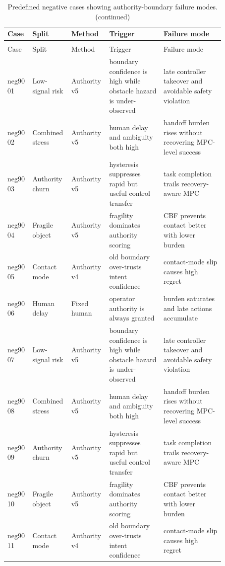 \documentclass{article}
\begin{document}
\begin{center}
\tiny
\begin{longtable}{@{}p{0.08\linewidth}p{0.14\linewidth}p{0.14\linewidth}p{0.24\linewidth}p{0.27\linewidth}@{}}
\caption{Predefined negative cases showing authority-boundary failure modes.}\label{tab:negative}\\
\toprule
Case & Split & Method & Trigger & Failure mode\\
\midrule
\endfirsthead
\caption[]{Predefined negative cases showing authority-boundary failure modes. (continued)}\\
\toprule
Case & Split & Method & Trigger & Failure mode\\
\midrule
\endhead
neg90 01 & Low-signal risk & Authority v5 & boundary confidence is high while obstacle hazard is under-observed & late controller takeover and avoidable safety violation\\
neg90 02 & Combined stress & Authority v5 & human delay and ambiguity both high & handoff burden rises without recovering MPC-level success\\
neg90 03 & Authority churn & Authority v5 & hysteresis suppresses rapid but useful control transfer & task completion trails recovery-aware MPC\\
neg90 04 & Fragile object & Authority v5 & fragility dominates authority scoring & CBF prevents contact better with lower burden\\
neg90 05 & Contact mode & Authority v4 & old boundary over-trusts intent confidence & contact-mode slip causes high regret\\
neg90 06 & Human delay & Fixed human & operator authority is always granted & burden saturates and late actions accumulate\\
neg90 07 & Low-signal risk & Authority v5 & boundary confidence is high while obstacle hazard is under-observed & late controller takeover and avoidable safety violation\\
neg90 08 & Combined stress & Authority v5 & human delay and ambiguity both high & handoff burden rises without recovering MPC-level success\\
neg90 09 & Authority churn & Authority v5 & hysteresis suppresses rapid but useful control transfer & task completion trails recovery-aware MPC\\
neg90 10 & Fragile object & Authority v5 & fragility dominates authority scoring & CBF prevents contact better with lower burden\\
neg90 11 & Contact mode & Authority v4 & old boundary over-trusts intent confidence & contact-mode slip causes high regret\\

\end{longtable}
\end{center}
\end{document}
